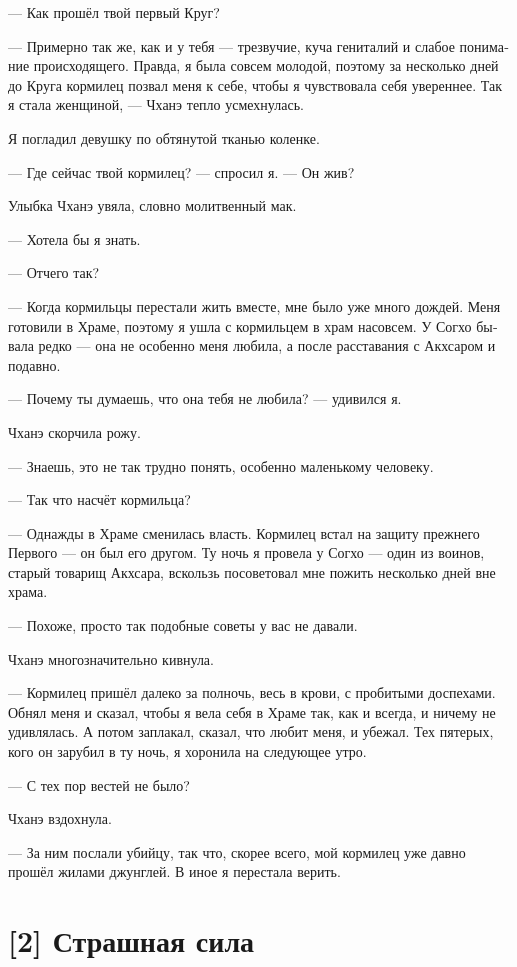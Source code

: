 \documentclass[a4paper,12pt,fleqn]{book}\usepackage{cooltooltips}\usepackage{polyglossia}\setdefaultlanguage[babelshorthands=true]{russian}\setotherlanguage{english}\defaultfontfeatures{Ligatures=TeX,Mapping=tex-text} \usepackage{xcolor}\definecolor{lightgray}{HTML}{bbbbbb}\color{lightgray}\newcommand{\ml}[3]{\textenglish{\textcolor{black}{#3}}}
\begin{document}
{--- Как прошёл твой первый Круг?

--- Примерно так же, как и у тебя --- трезвучие, куча гениталий и слабое понимание происходящего.
Правда, я была совсем молодой, поэтому за несколько дней до Круга кормилец позвал меня к себе, чтобы я чувствовала себя увереннее.
Так я стала женщиной, --- Чханэ тепло усмехнулась.

Я погладил девушку по обтянутой тканью коленке.

--- Где сейчас твой кормилец? --- спросил я.
--- Он жив?

Улыбка Чханэ увяла, словно молитвенный мак.

--- Хотела бы я знать.

--- Отчего так?

--- Когда кормильцы перестали жить вместе, мне было уже много дождей.
Меня готовили в Храме, поэтому я ушла с кормильцем в храм насовсем.
У Согхо бывала редко --- она не особенно меня любила, а после расставания с Акхсаром и подавно.

--- Почему ты думаешь, что она тебя не любила? --- удивился я.

Чханэ скорчила рожу.

--- Знаешь, это не так трудно понять, особенно маленькому человеку.

--- Так что насчёт кормильца?

--- Однажды в Храме сменилась власть.
Кормилец встал на защиту прежнего Первого --- он был его другом.
Ту ночь я провела у Согхо --- один из воинов, старый товарищ Акхсара, вскользь посоветовал мне пожить несколько дней вне храма.

--- Похоже, просто так подобные советы у вас не давали.

Чханэ многозначительно кивнула.

--- Кормилец пришёл далеко за полночь, весь в крови, с пробитыми доспехами.
Обнял меня и сказал, чтобы я вела себя в Храме так, как и всегда, и ничему не удивлялась.
А потом заплакал, сказал, что любит меня, и убежал.
Тех пятерых, кого он зарубил в ту ночь, я хоронила на следующее утро.

--- С тех пор вестей не было?

Чханэ вздохнула.

--- За ним послали убийцу, так что, скорее всего, мой кормилец уже давно прошёл жилами джунглей.
В иное я перестала верить.

\section{[2] Страшная сила}

}
\end{document}
